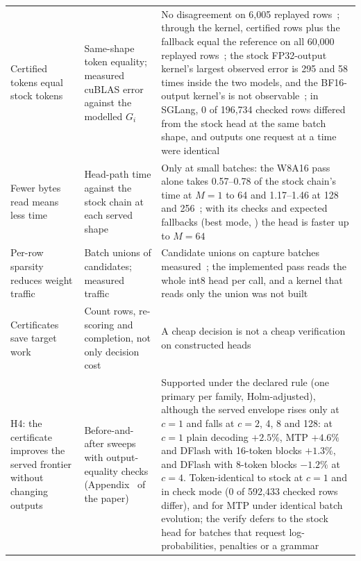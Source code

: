 {\begin{longtable}{@{}P{5.2cm}P{4.6cm}P{6.5cm}@{}}
\quad Certified tokens equal stock tokens & Same-shape token equality; measured cuBLAS error against the modelled $G_i$ & No disagreement on 6,005 replayed rows~; through the kernel, certified rows plus the fallback equal the reference on all 60,000 replayed rows~; the stock FP32-output kernel's largest observed error is 295 and 58 times inside the two models, and the BF16-output kernel's is not observable~; in SGLang, 0 of 196,734 checked rows differed from the stock head at the same batch shape, and outputs one request at a time were identical~\\
\quad Fewer bytes read means less time & Head-path time against the stock chain at each served shape & Only at small batches: the W8A16 pass alone takes 0.57--0.78 of the stock chain's time at $M=1$ to 64 and 1.17--1.46 at 128 and 256~; with its checks and expected fallbacks (best mode, \modelcons{}) the head is faster up to $M=64$~\\
\quad Per-row sparsity reduces weight traffic & Batch unions of candidates; measured traffic & Candidate unions on capture batches measured~; the implemented pass reads the whole int8 head per call, and a kernel that reads only the union was not built\\
\quad Certificates save target work & Count rows, re-scoring and completion, not only decision cost & A cheap decision is not a cheap verification on constructed heads~\\
H4: the certificate improves the served frontier without changing outputs & Before-and-after sweeps with output-equality checks (Appendix~ of the paper) & Supported under the declared rule (one primary per family, Holm-adjusted), although the served envelope rises only at $c=1$ and falls at $c=2$, 4, 8 and 128: at $c=1$ plain decoding $+2.5\%$, MTP $+4.6\%$ and DFlash with 16-token blocks $+1.3\%$, and DFlash with 8-token blocks $-1.2\%$ at $c=4$. Token-identical to stock at $c=1$ and in check mode (0 of 592,433 checked rows differ), and for MTP under identical batch evolution; the verify defers to the stock head for batches that request log-probabilities, penalties or a grammar~\\

\end{longtable}}
